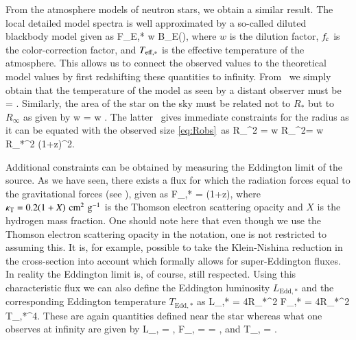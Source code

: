 From the atmosphere models of neutron stars, we obtain a similar result.
The local detailed model spectra is well approximated by a so-called diluted blackbody model given as
\be
F_{E,*} \approx \pi w B_E(\fc \Teffs),
\ee
where $w$ is the dilution factor, $f_{\mathrm{c}}$ is the color-correction factor, and $T_{\mathrm{eff},*}$ is the effective temperature of the atmosphere.
This allows us to connect the observed values to the theoretical model values by first redshifting these quantities to infinity.
From \ we simply obtain that the temperature of the model as seen by a distant observer must be
\be
\fc \Teffi = \fc {}.
\ee
Similarly, the area of the star on the sky must be related not to $R_*$ but to $R_{\infty}$ as given by 
\be\label{eq:Rmod}
w = w .
\ee
The latter \ gives immediate constraints for the radius as it can be equated with the observed size \eqref{eq:Robs}\ as\cite{Penninx89, vParadijs90}
\be
R_{}^2 =  w R_{\infty}^2= w R_*^2 (1+z)^2.
\ee

Additional constraints can be obtained by measuring the Eddington limit of the source.
As we have seen, there exists a flux for which the radiation forces equal to the gravitational forces (see ), given as 
\be
F_{,*} =  (1+z),
\ee
where $\kappa_{\mathrm{T}} = 0.2(1+X)\,\, \mathrm{cm}^2\,\, \mathrm{g}^{-1}$ is the Thomson electron scattering opacity and $X$ is the hydrogen mass fraction.
One should note here that even though we use the Thomson electron scattering opacity in the notation, one is not restricted to assuming this.
It is, for example, possible to take the Klein-Nishina reduction in the cross-section into account which formally allows for super-Eddington fluxes.\cite{SPW12}
In reality the Eddington limit is, of course, still respected.
Using this characteristic flux we can also define the Eddington luminosity $L_{\mathrm{Edd},*}$ and the corresponding Eddington temperature $T_{\mathrm{Edd},*}$ as
\be
L_{,*} =  4\pi R_*^2 F_{,*} = 4\pi R_*^2 \sigmaSB T_{,*}^4.
\ee
These are again quantities defined near the star whereas what one observes at infinity are given by
\be
L_{,\infty} = ,
\ee
\be
F_{,\infty} =  =  ,
\ee
and
\be
T_{,\infty} = .
\ee

